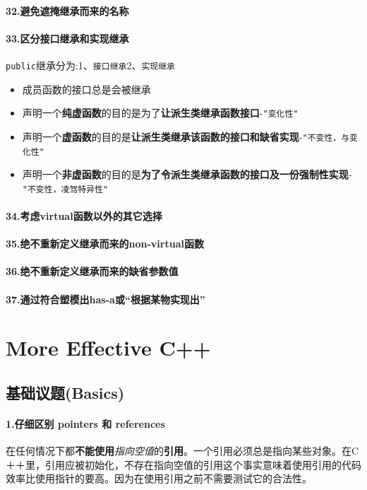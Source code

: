 \documentclass[UTF8,a4paper,12pt]{ctexbook}
\begin{document}
		\paragraph{32.避免遮掩继承而来的名称}
		\paragraph{33.区分接口继承和实现继承}
			\verb|public|继承分为:1、\verb|接口继承|2、\verb|实现继承|
			\begin{itemize}
				\item 成员函数的接口总是会被继承
				\item 声明一个\textbf{纯虚函数}的目的是为了\textbf{让派生类继承函数接口}-\verb|"变化性"|
				\item 声明一个\textbf{虚函数}的目的是\textbf{让派生类继承该函数的接口和缺省实现}-\verb|"不变性，与变化性"|
				\item 声明一个\textbf{非虚函数}的目的是\textbf{为了令派生类继承函数的接口及一份强制性实现}-\verb|"不变性，凌驾特异性"|
			\end{itemize}
		\paragraph{34.考虑virtual函数以外的其它选择}
		\paragraph{35.绝不重新定义继承而来的non-virtual函数}
		\paragraph{36.绝不重新定义继承而来的缺省参数值}
		\paragraph{37.通过符合塑模出has-a或“根据某物实现出”}
	\section{More Effective C++}
		\subsection{基础议题(Basics)}
			\paragraph{1.仔细区别 pointers 和 references}
				在任何情况下都\textbf{不能使用}\textit{指向空值}的\textbf{引用}。一个引用必须总是指向某些对象。在C＋＋里，引用应被初始化，不存在指向空值的引用这个事实意味着使用引用的代码效率比使用指针的要高。因为在使用引用之前不需要测试它的合法性。
				
\end{document}
